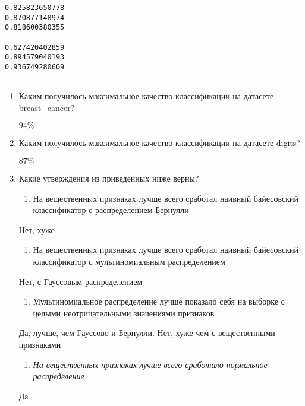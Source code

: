\documentclass[11pt]{article}
\providecommand{\tightlist}{%
      \setlength{\itemsep}{0pt}\setlength{\parskip}{0pt}}
\begin{document}
    \begin{Verbatim}[commandchars=\\\{\}]
0.825823650778
0.870877148974
0.818600380355

0.627420402859
0.894579040193
0.936749280609


    \end{Verbatim}

    \begin{enumerate}
\def\labelenumi{\arabic{enumi}.}
\item
  Каким получилось максимальное качество классификации на датасете
  breast\_cancer?

  \(94\%\)
\item
  Каким получилось максимальное качество классификации на датасете
  digits?

  \(87\%\)
\item
  Какие утверждения из приведенных ниже верны?

  \begin{enumerate}
  \def\labelenumii{(\alph{enumii})}
  \tightlist
  \item
    На вещественных признаках лучше всего сработал наивный байесовский
    классификатор с распределением Бернулли
  \end{enumerate}

  Нет, хуже

  \begin{enumerate}
  \def\labelenumii{(\alph{enumii})}
  \setcounter{enumii}{1}
  \tightlist
  \item
    На вещественных признаках лучше всего сработал наивный байесовский
    классификатор с мультиномиальным распределением
  \end{enumerate}

  Нет, с Гауссовым распределением

  \begin{enumerate}
  \def\labelenumii{(\alph{enumii})}
  \setcounter{enumii}{2}
  \tightlist
  \item
    Мультиномиальное распределение лучше показало себя на выборке с
    целыми неотрицательными значениями признаков
  \end{enumerate}

  Да, лучше, чем Гауссово и Бернулли. Нет, хуже чем с вещественными
  признаками

  \begin{enumerate}
  \def\labelenumii{(\alph{enumii})}
  \setcounter{enumii}{3}
  \tightlist
  \item
    \emph{На вещественных признаках лучше всего сработало нормальное
    распределение}
  \end{enumerate}

  Да
\end{enumerate}
\end{document}
